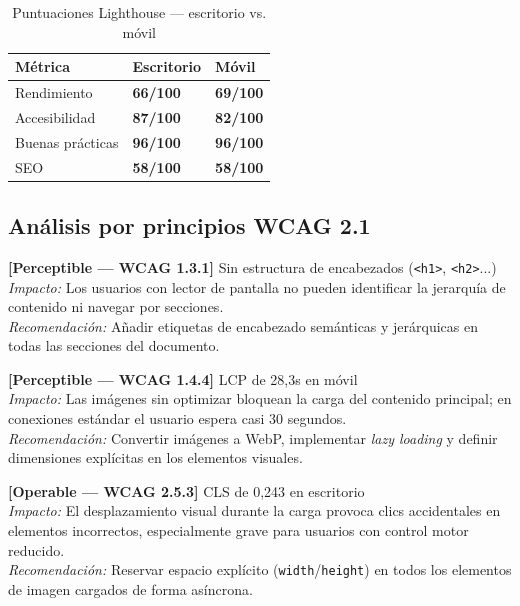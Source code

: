 \documentclass[11pt,a4paper]{article}
\begin{document}
\begin{table}[H]
\centering
\caption{Puntuaciones Lighthouse — escritorio vs. móvil}
\begin{tabularx}{0.68\textwidth}{@{} X C{2.6cm} C{2.6cm} @{}}
\toprule
{}
\color{white}\textbf{Métrica}     &
\color{white}\textbf{Escritorio}  &
\color{white}\textbf{Móvil}       \\
\midrule
Rendimiento      &
  \textcolor{warnamber}{\textbf{66/100}}  &
  \textcolor{warnamber}{\textbf{69/100}}  \\
Accesibilidad    &
  \textcolor{okgreen}{\textbf{87/100}}    &
  \textcolor{warnamber}{\textbf{82/100}}  \\
Buenas prácticas &
  \textcolor{okgreen}{\textbf{96/100}}    &
  \textcolor{okgreen}{\textbf{96/100}}    \\
SEO              &
  \textcolor{dangerred}{\textbf{58/100}}  &
  \textcolor{dangerred}{\textbf{58/100}}  \\
\bottomrule
\end{tabularx}
\end{table}

\subsection{Análisis por principios WCAG 2.1}

\medskip
\noindent\textbf{[Perceptible — WCAG 1.3.1]}\enspace
Sin estructura de encabezados (\texttt{<h1>}, \texttt{<h2>}...)\\
\textit{Impacto:} Los usuarios con lector de pantalla no pueden identificar la jerarquía
de contenido ni navegar por secciones.\\
\textit{Recomendación:} Añadir etiquetas de encabezado semánticas y jerárquicas en
todas las secciones del documento.

\medskip
\noindent\textbf{[Perceptible — WCAG 1.4.4]}\enspace
LCP de 28,3s en móvil\\
\textit{Impacto:} Las imágenes sin optimizar bloquean la carga del contenido principal;
en conexiones estándar el usuario espera casi 30 segundos.\\
\textit{Recomendación:} Convertir imágenes a WebP, implementar \textit{lazy loading}
y definir dimensiones explícitas en los elementos visuales.

\medskip
\noindent\textbf{[Operable — WCAG 2.5.3]}\enspace
CLS de 0,243 en escritorio\\
\textit{Impacto:} El desplazamiento visual durante la carga provoca clics accidentales
en elementos incorrectos, especialmente grave para usuarios con control motor reducido.\\
\textit{Recomendación:} Reservar espacio explícito (\texttt{width}/\texttt{height})
en todos los elementos de imagen cargados de forma asíncrona.
\end{document}
